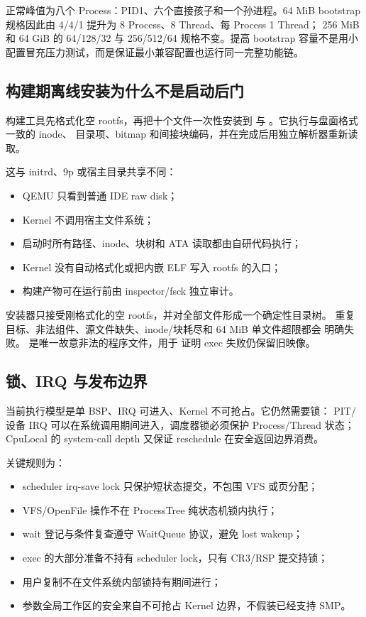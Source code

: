 正常峰值为八个 Process：PID1、六个直接孩子和一个孙进程。64 MiB bootstrap
规格因此由 4/4/1 提升为 8 Process、8 Thread、每 Process 1 Thread；
256 MiB 和 64 GiB 的 64/128/32 与 256/512/64 规格不变。提高 bootstrap
容量不是用小配置冒充压力测试，而是保证最小兼容配置也运行同一完整功能链。

\subsection{构建期离线安装为什么不是启动后门}

构建工具先格式化空 rootfs，再把十个文件一次性安装到
 与 。它执行与盘面格式一致的 inode、
目录项、bitmap 和间接块编码，并在完成后用独立解析器重新读取。

这与 initrd、9p 或宿主目录共享不同：

\begin{itemize}
  \item QEMU 只看到普通 IDE raw disk；
  \item Kernel 不调用宿主文件系统；
  \item 启动时所有路径、inode、块树和 ATA 读取都由自研代码执行；
  \item Kernel 没有自动格式化或把内嵌 ELF 写入 rootfs 的入口；
  \item 构建产物可在运行前由 inspector/fsck 独立审计。
\end{itemize}

安装器只接受刚格式化的空 rootfs，并对全部文件形成一个确定性目录树。
重复目标、非法组件、源文件缺失、inode/块耗尽和 64 MiB 单文件超限都会
明确失败。 是唯一故意非法的程序文件，用于
证明 exec 失败仍保留旧映像。

\subsection{锁、IRQ 与发布边界}

当前执行模型是单 BSP、IRQ 可进入、Kernel 不可抢占。它仍然需要锁：
PIT/设备 IRQ 可以在系统调用期间进入，调度器锁必须保护 Process/Thread
状态；CpuLocal 的 system-call depth 又保证 reschedule 在安全返回边界消费。

关键规则为：

\begin{itemize}
  \item scheduler irq-save lock 只保护短状态提交，不包围 VFS 或页分配；
  \item VFS/OpenFile 操作不在 ProcessTree 纯状态机锁内执行；
  \item wait 登记与条件复查遵守 WaitQueue 协议，避免 lost wakeup；
  \item exec 的大部分准备不持有 scheduler lock，只有 CR3/RSP 提交持锁；
  \item 用户复制不在文件系统内部锁持有期间进行；
  \item 参数全局工作区的安全来自不可抢占 Kernel 边界，不假装已经支持 SMP。
\end{itemize}

